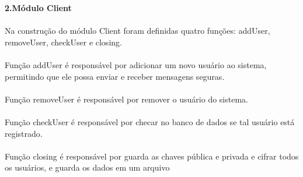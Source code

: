 \documentclass{article}
\begin{document}
\large \textbf{2.Módulo Client}\\ \\
\hspace*{1cm} Na construção do módulo Client foram definidas quatro funções: addUser, removeUser, checkUser e  closing. \\ \\
\hspace{1cm} Função addUser é responsável por adicionar um novo usuário ao sistema, permitindo que ele possa enviar e receber mensagens seguras.\\ \\
\hspace{1cm} Função removeUser é responsável por remover o usuário do sistema.\\ \\
\hspace{1cm} Função checkUser é responsável por checar no banco de dados se tal usuário está registrado.\\ \\
\hspace{1cm} Função closing é responsável por guarda as chaves pública e privada e cifrar todos os usuários, e guarda os dados em um arquivo
\end{document}

